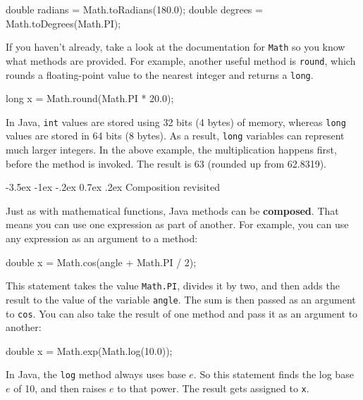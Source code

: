 \documentclass[12pt]{book}
\makeatletter
\theoremstyle{exercise}
\newcommand{\java}[1]{\verb"#1"}
\renewcommand{\section}{\@startsection{section}{1}{\z@}%
    {-3.5ex \@plus -1ex \@minus -.2ex}%
    {0.7ex \@plus.2ex}%
    {\normalfont\Large\bfseries}}
\newcommand{\java}[1]{\lstinline{#1}} %
\makeatother
\begin{document}
\begin{code}
    double radians = Math.toRadians(180.0);
    double degrees = Math.toDegrees(Math.PI);
\end{code}


If you haven't already, take a look at the documentation for \java{Math} so you know what methods are provided.
For example, another useful method is \java{round}, which rounds a floating-point value to the nearest integer and returns a \java{long}.

\begin{code}
    long x = Math.round(Math.PI * 20.0);
\end{code}

In Java, \java{int} values are stored using 32 bits (4 bytes) of memory, whereas \java{long} values are stored in 64 bits (8 bytes).
As a result, \java{long} variables can represent much larger integers.
In the above example, the multiplication happens first, before the method is invoked.
The result is 63 (rounded up from 62.8319).

\section{Composition revisited}


Just as with mathematical functions, Java methods can be {\bf composed}.
That means you can use one expression as part of another.
For example, you can use any expression as an argument to a method:

\begin{code}
    double x = Math.cos(angle + Math.PI / 2);
\end{code}

This statement takes the value \java{Math.PI}, divides it by two, and then adds the result to the value of the variable \java{angle}.
The sum is then passed as an argument to \java{cos}.
You can also take the result of one method and pass it as an argument to another:

\begin{code}
    double x = Math.exp(Math.log(10.0));
\end{code}

In Java, the \java{log} method always uses base $e$.
So this statement finds the log base $e$ of 10, and then raises $e$ to that power.
The result gets assigned to \java{x}.
\end{document}
